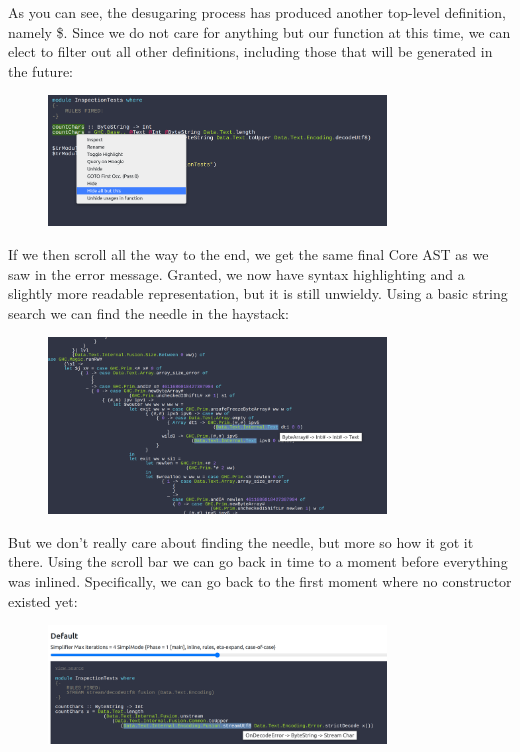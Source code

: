 As you can see, the desugaring process has produced another top-level definition, namely \$. Since we do
not care for anything but our  function at this time, we can elect to filter out all other definitions,
including those that will be generated in the future: 

\begin{figure}[H]
\centering
\includegraphics[width=0.8\textwidth]{figs/countchars_hideallbut.png}
\label{fig:countchars_3}
\end{figure}

If we then scroll all the way to the end, we get the same final Core AST as we saw in the error message. Granted,
we now have syntax highlighting and a slightly more readable representation, but it is still unwieldy. Using a basic string search we can find the needle in the haystack:

\begin{figure}[H]
\centering
\includegraphics[width=0.8\textwidth]{figs/countchars_3.png}
\end{figure}

But we don't really care about finding the needle, but more so how it got it there.
Using the scroll bar we can go back in time to a moment before everything was inlined.
Specifically, we can go back to the first moment where no  constructor existed yet:

\begin{figure}[H]
\centering
\includegraphics[width=0.8\textwidth]{figs/countchars_4.png}
\end{figure}

